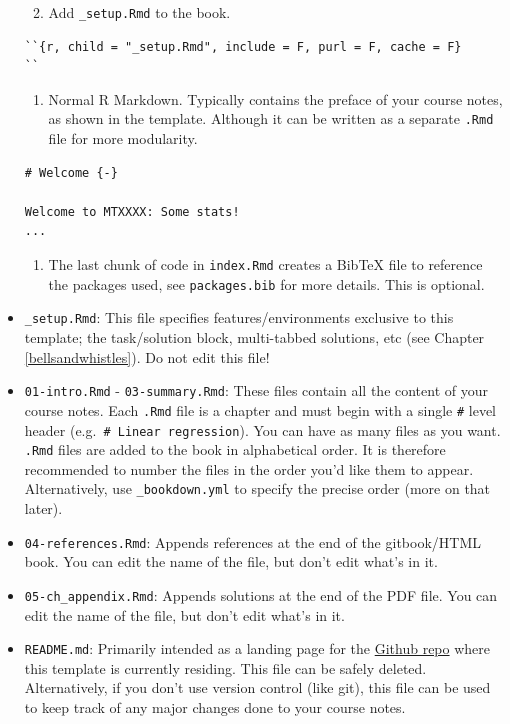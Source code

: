 \documentclass[
]{book}
\providecommand{\tightlist}{%
  \setlength{\itemsep}{0pt}\setlength{\parskip}{0pt}}
\theoremstyle{definition}
\theoremstyle{definition}
\theoremstyle{definition}
\theoremstyle{remark}
\begin{document}
\begin{itemize}
  \begin{enumerate}
  \def\labelenumi{\arabic{enumi}.}
  \setcounter{enumi}{2}
  \tightlist
  \item
    Add \texttt{\_setup.Rmd} to the book.
  \end{enumerate}

\begin{verbatim}
``{r, child = "_setup.Rmd", include = F, purl = F, cache = F}
``
\end{verbatim}

  \begin{enumerate}
  \def\labelenumi{\arabic{enumi}.}
  \setcounter{enumi}{3}
  \tightlist
  \item
    Normal R Markdown. Typically contains the preface of your course notes, as shown in the template.
    Although it can be written as a separate \texttt{.Rmd} file for more modularity.
  \end{enumerate}

\begin{verbatim}
# Welcome {-}

Welcome to MTXXXX: Some stats!
...
\end{verbatim}

  \begin{enumerate}
  \def\labelenumi{\arabic{enumi}.}
  \setcounter{enumi}{4}
  \tightlist
  \item
    The last chunk of code in \texttt{index.Rmd} creates a BibTeX file to reference the packages used, see \texttt{packages.bib} for more details. This is optional.
  \end{enumerate}
\item
  \texttt{\_setup.Rmd}: This file specifies features/environments exclusive to this template; the task/solution block, multi-tabbed solutions, etc (see Chapter \ref{bellsandwhistles}).
  Do not edit this file!
\item
  \texttt{01-intro.Rmd} - \texttt{03-summary.Rmd}: These files contain all the content of your course notes. Each \texttt{.Rmd} file is a chapter and must begin with a single \texttt{\#} level header (e.g.~\texttt{\#\ Linear\ regression}). You can have as many files as you want. \texttt{.Rmd} files are added to the book in alphabetical order. It is therefore recommended to number the files in the order you'd like them to appear. Alternatively, use \texttt{\_bookdown.yml} to specify the precise order (more on that later).
\item
  \texttt{04-references.Rmd}: Appends references at the end of the gitbook/HTML book. You can edit the name of the file, but don't edit what's in it.
\item
  \texttt{05-ch\_appendix.Rmd}: Appends solutions at the end of the PDF file. You can edit the name of the file, but don't edit what's in it.
\item
  \texttt{README.md}: Primarily intended as a landing page for the \href{https://github.com/lindesaysh/StAndrewsTemplateBookdown}{Github repo} where this template is currently residing. This file can be safely deleted. Alternatively, if you don't use version control (like git), this file can be used to keep track of any major changes done to your course notes.
\end{itemize}
\end{document}
